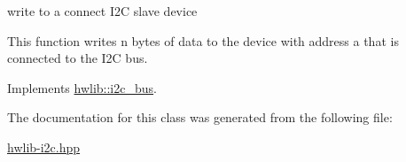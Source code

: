 write to a connect I2C slave device 

This function writes n bytes of data to the device with address a that is connected to the I2C bus. 

Implements \hyperlink{classhwlib_1_1i2c__bus_ab61d2f9d41ce7c019599fcbb87a420c0}{hwlib\+::i2c\+\_\+bus}.



The documentation for this class was generated from the following file\+:\begin{DoxyCompactItemize}
\item 
\hyperlink{hwlib-i2c_8hpp}{hwlib-\/i2c.\+hpp}\end{DoxyCompactItemize}

